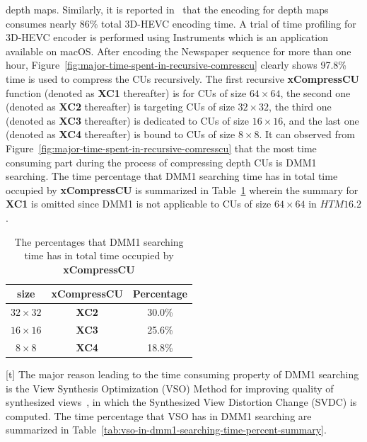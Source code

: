 depth maps.
Similarly, it is reported in~\parencite{RN111} that the 
encoding for depth maps
consumes nearly 86\% total 3D-HEVC encoding time.
A trial of time profiling for 3D-HEVC encoder is performed using Instruments
which is an application available on macOS\@.
After encoding the Newspaper sequence for more than one hour,
Figure~\ref{fig:major-time-spent-in-recursive-comresscu} clearly shows
97.8\% time is used to compress the CUs recursively.
The first recursive \textbf{xCompressCU} function 
(denoted as \textbf{XC1} thereafter) is
for CUs of size \(64\times64\), 
the second one
(denoted as \textbf{XC2} thereafter) is targeting 
CUs of size \(32\times32\),
the third one (denoted as \textbf{XC3} thereafter) is dedicated
to CUs of size \(16\times16\), 
and the last one 
(denoted as \textbf{XC4} thereafter) is bound
to CUs of size \(8\times8\).
It can observed from 
Figure~\ref{fig:major-time-spent-in-recursive-comresscu} 
that the most time consuming part
during the process of
compressing depth CUs is DMM1 searching.
The time percentage that DMM1 searching time has in total time occupied 
by \textbf{xCompressCU} is summarized in
Table~\ref{tab:dmm1-searching-time-percent-summary} wherein the summary
for \textbf{XC1} is omitted since DMM1 is not 
applicable to CUs of size \(64\times64\) in
\(HTM16.2\).
\begin{table}[t]
    \caption{The percentages that DMM1 searching time has in total time occupied 
    by \textbf{xCompressCU}}
    \bigskip\label{tab:dmm1-searching-time-percent-summary}
    \centering
    \begin{tabular}{c c c}
        \toprule
        size & xCompressCU & Percentage\\
        \midrule
        \(32\times32\)  & \textbf{XC2} & 30.0\% \\
        \(16\times16\) & \textbf{XC3} & 25.6\% \\
        \(8\times8\) & \textbf{XC4} & 18.8\% \\
        \bottomrule
    \end{tabular}
\end{table}[t]
The major reason leading to the time consuming property of DMM1 searching is the
View Synthesis Optimization (VSO) Method for improving quality of
synthesized views~\parencite{RN124}, in which the Synthesized View Distortion
Change (SVDC) is computed.
The time percentage that VSO has in DMM1 searching are summarized in
Table~\ref{tab:vso-in-dmm1-searching-time-percent-summary}.
